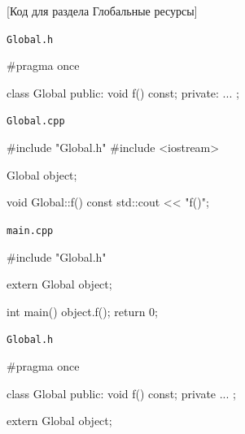 [Код для раздела Глобальные ресурсы]


\newcommand{\codewidth}{5cm}

\newsavebox\globalh
\begin{lrbox}{\globalh}%
\begin{minipage}[\baselineskip]{\codewidth}
\texttt{Global.h}
\begin{cppcode}[numbers = none]
#pragma once

class Global {
public:
  void f() const;
private:
  ...
};
\end{cppcode}
\end{minipage}%
\end{lrbox}

\newsavebox\globalcpp
\begin{lrbox}{\globalcpp}%
\begin{minipage}[\baselineskip]{\codewidth}
\texttt{Global.cpp}
\begin{cppcode}[numbers = none]
#include "Global.h"
#include <iostream>

Global object;

void Global::f() const {
  std::cout << "f()\n";
}
\end{cppcode}
\end{minipage}%
\end{lrbox}

\newsavebox\maincpp
\begin{lrbox}{\maincpp}%
\begin{minipage}[\baselineskip]{\codewidth}
\texttt{main.cpp}
\begin{cppcode}[numbers = none]
#include "Global.h"

extern Global object;

int main() {
  object.f();
  return 0;
}
\end{cppcode}
\end{minipage}%
\end{lrbox}

\newsavebox\globalAh
\begin{lrbox}{\globalAh}%
\begin{minipage}[\baselineskip]{\codewidth}
\texttt{Global.h}
\begin{cppcode}[numbers = none]
#pragma once

class Global {
public:
  void f() const;
private
  ...
};

extern Global object;
\end{cppcode}
\end{minipage}%
\end{lrbox}

